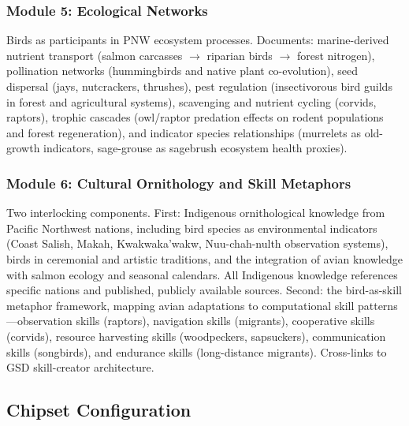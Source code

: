 \documentclass[11pt,letterpaper]{article}
\begin{document}
\subsubsection{Module 5: Ecological Networks}
Birds as participants in PNW ecosystem processes. Documents: marine-derived nutrient transport (salmon carcasses $\rightarrow$ riparian birds $\rightarrow$ forest nitrogen), pollination networks (hummingbirds and native plant co-evolution), seed dispersal (jays, nutcrackers, thrushes), pest regulation (insectivorous bird guilds in forest and agricultural systems), scavenging and nutrient cycling (corvids, raptors), trophic cascades (owl/raptor predation effects on rodent populations and forest regeneration), and indicator species relationships (murrelets as old-growth indicators, sage-grouse as sagebrush ecosystem health proxies).

\subsubsection{Module 6: Cultural Ornithology and Skill Metaphors}
Two interlocking components. First: Indigenous ornithological knowledge from Pacific Northwest nations, including bird species as environmental indicators (Coast Salish, Makah, Kwakwaka'wakw, Nuu-chah-nulth observation systems), birds in ceremonial and artistic traditions, and the integration of avian knowledge with salmon ecology and seasonal calendars. All Indigenous knowledge references specific nations and published, publicly available sources. Second: the bird-as-skill metaphor framework, mapping avian adaptations to computational skill patterns---observation skills (raptors), navigation skills (migrants), cooperative skills (corvids), resource harvesting skills (woodpeckers, sapsuckers), communication skills (songbirds), and endurance skills (long-distance migrants). Cross-links to GSD skill-creator architecture.

\subsection{Chipset Configuration}
\end{document}
